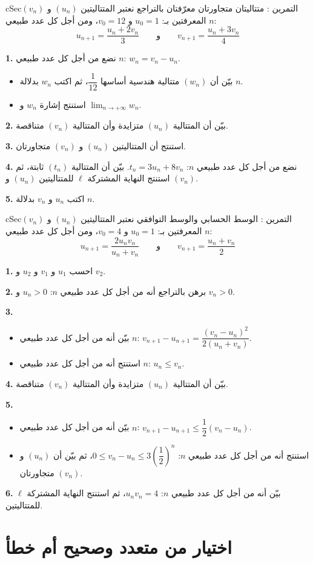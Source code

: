 \documentclass[12pt,a4paper]{article}
\newenvironment{BOX}[2]{\begin{otherlanguage}{english}\begin{arbox}{#1}{#2}}{\end{arbox}\end{otherlanguage}}
\newcounter{exo}
\newenvironment{tamrin}[1]{\stepcounter{exo}\begin{BOX}{cSec}{التمرين \theexo: #1}}{\end{BOX}}
\newcommand{\limn}{\displaystyle\lim_{n\to+\infty}}
\newenvironment{sq}{\begin{itemize}[leftmargin=2.4em,itemsep=3pt]}{\end{itemize}}
\newcommand{\qa}{\item[(أ)]}\newcommand{\qb}{\item[(ب)]}\newcommand{\qc}{\item[(جـ)]}\newcommand{\qd}{\item[(د)]}\newcommand{\qe}{\item[(هـ)]}
\newcommand{\QQ}[1]{\par\smallskip\textbf{#1.} }
\begin{document}
\begin{tamrin}{متتاليتان متجاورتان معرّفتان بالتراجع}
نعتبر المتتاليتين $(u_n)$ و $(v_n)$ المعرفتين بـ: $u_0=1$ و $v_0=12$، ومن أجل كل عدد طبيعي $n$:
\[u_{n+1}=\frac{u_n+2v_n}{3}\qquad\text{و}\qquad v_{n+1}=\frac{u_n+3v_n}{4}\]
\QQ{1} نضع من أجل كل عدد طبيعي $n$: $w_n=v_n-u_n$.
\begin{sq}
\qa بيّن أن $(w_n)$ متتالية هندسية أساسها $\dfrac1{12}$، ثم اكتب $w_n$ بدلالة $n$.
\qb استنتج إشارة $w_n$ و $\limn w_n$.
\end{sq}
\QQ{2} بيّن أن المتتالية $(u_n)$ متزايدة وأن المتتالية $(v_n)$ متناقصة.
\QQ{3} استنتج أن المتتاليتين $(u_n)$ و $(v_n)$ متجاورتان.
\QQ{4} نضع من أجل كل عدد طبيعي $n$: $t_n=3u_n+8v_n$. بيّن أن المتتالية $(t_n)$ ثابتة، ثم استنتج النهاية المشتركة $\ell$ للمتتاليتين $(u_n)$ و $(v_n)$.
\QQ{5} اكتب $u_n$ و $v_n$ بدلالة $n$.
\end{tamrin}

\begin{tamrin}{الوسط الحسابي والوسط التوافقي}
نعتبر المتتاليتين $(u_n)$ و $(v_n)$ المعرفتين بـ: $u_0=1$ و $v_0=4$، ومن أجل كل عدد طبيعي $n$:
\[u_{n+1}=\frac{2u_nv_n}{u_n+v_n}\qquad\text{و}\qquad v_{n+1}=\frac{u_n+v_n}{2}\]
\QQ{1} احسب $u_1$ و $v_1$ و $u_2$ و $v_2$.
\QQ{2} برهن بالتراجع أنه من أجل كل عدد طبيعي $n$: $u_n>0$ و $v_n>0$.
\QQ{3}
\begin{sq}
\qa بيّن أنه من أجل كل عدد طبيعي $n$: $v_{n+1}-u_{n+1}=\dfrac{\left(v_n-u_n\right)^2}{2\left(u_n+v_n\right)}$.
\qb استنتج أنه من أجل كل عدد طبيعي $n$: $u_n\leqslant v_n$.
\end{sq}
\QQ{4} بيّن أن المتتالية $(u_n)$ متزايدة وأن المتتالية $(v_n)$ متناقصة.
\QQ{5}
\begin{sq}
\qa بيّن أنه من أجل كل عدد طبيعي $n$: $v_{n+1}-u_{n+1}\leqslant\dfrac12\left(v_n-u_n\right)$.
\qb استنتج أنه من أجل كل عدد طبيعي $n$: $0\leqslant v_n-u_n\leqslant3\left(\dfrac12\right)^n$، ثم بيّن أن $(u_n)$ و $(v_n)$ متجاورتان.
\end{sq}
\QQ{6} بيّن أنه من أجل كل عدد طبيعي $n$: $u_nv_n=4$، ثم استنتج النهاية المشتركة $\ell$ للمتتاليتين.
\end{tamrin}

\section{اختيار من متعدد وصحيح أم خطأ}
\end{document}
